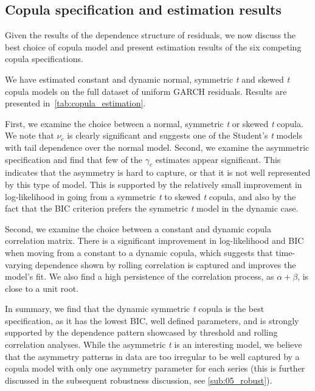 \subsection{Copula specification and estimation results}
Given the results of the dependence structure of residuals, we now discuss the best choice of copula model and present estimation results of the six competing copula specifications.

We have estimated constant and dynamic normal, symmetric \emph{t} and skewed \emph{t} copula models on the full dataset of uniform GARCH residuals. Results are presented in~\autoref{tab:copula_estimation}. 

First, we examine the choice between a normal, symmetric \emph{t} or skewed \emph{t} copula. We note that $\nu_c$ is clearly significant and suggests one of the Student's \emph{t} models with tail dependence over the normal model. Second, we examine the asymmetric specification and find that few of the $\gamma_c$ estimates appear significant. This indicates that the asymmetry is hard to capture, or that it is not well represented by this type of model. This is supported by the relatively small improvement in log-likelihood in going from a symmetric \emph{t} to skewed \emph{t} copula, and also by the fact that the BIC criterion prefers the symmetric \emph{t} model in the dynamic case. 

Second, we examine the choice between a constant and dynamic copula correlation matrix. There is a significant improvement in log-likelihood and BIC when moving from a constant to a dynamic copula, which suggests that time-varying dependence shown by rolling correlation is captured and improves the model's fit. We also find a high persistence of the correlation process, as $\alpha + \beta$, is close to a unit root.

In summary, we find that the dynamic symmetric \emph{t} copula is the best specification, as it has the lowest BIC, well defined parameters, and is strongly supported by the dependence pattern showcased by threshold and rolling correlation analyses. While the asymmetric \emph{t} is an interesting model, we believe that the asymmetry patterns in data are too irregular to be well captured by a copula model with only one asymmetry parameter for each series (this is further discussed in the subsequent robustness discussion, see \autoref{sub:05_robust}).

